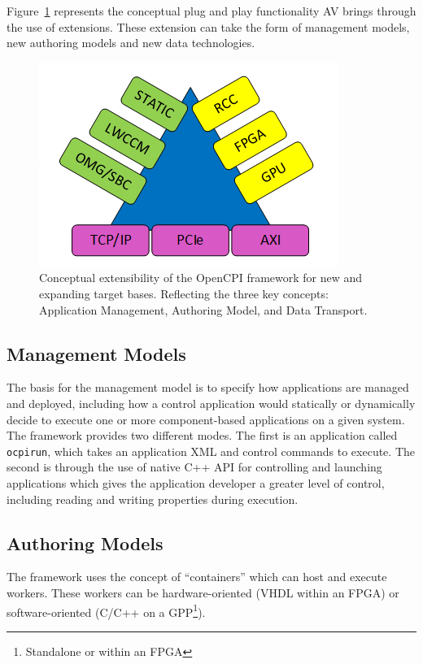 Figure~\ref{fig:what_is_av} represents the conceptual plug and play functionality AV brings through the use of extensions. These extension can take the form of management models, new authoring models and new data technologies.

\begin{figure}[h]
\centerline{\includegraphics[scale=0.75]{./figures/pillars_of_ocpi.png}}
\caption{Conceptual extensibility of the OpenCPI framework for new and expanding target bases. Reflecting the three key concepts: Application Management, Authoring Model, and Data Transport.}
\label{fig:what_is_av}
\end{figure}

\subsection{Management Models}
\label{subsec:Mangement_models}
The basis for the management model is to specify how applications are managed and deployed, including how a control application would statically or dynamically decide to execute one or more component-based applications on a given system. The framework provides two different modes. The first is an application called \verb+ocpirun+, which takes an application XML and control commands to execute. The second is through the use of native C++ API for controlling and launching applications which gives the application developer a greater level of control, including reading and writing properties during execution.

\subsection{Authoring Models}
\label{subsec:Authoring_Models}
The framework uses the concept of ``containers'' which can host and execute workers. These workers can be hardware-oriented (VHDL within an FPGA) or software-oriented (C/C++ on a GPP\footnote{Standalone or within an FPGA}).

